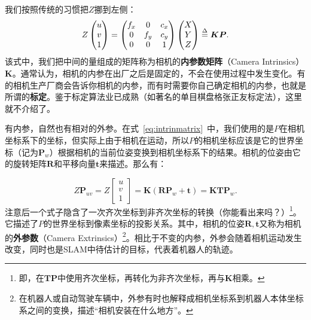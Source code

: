 我们按照传统的习惯把$Z$挪到左侧：
\begin{equation}
Z \begin{pmatrix} u\\ v\\ 1 \end{pmatrix}= \begin{pmatrix} f_x & 0&c_x \\ 0& f_y& c_y\\ 0&0 & 1 \end{pmatrix}\begin{pmatrix} X\\ Y\\ Z \end{pmatrix} 
\buildrel \Delta \over = \bm{K} \bm{P}.
\end{equation}
该式中，我们把中间的量组成的矩阵称为相机的\textbf{内参数矩阵}（Camera Intrinsics）$\bm{K}$。通常认为，相机的内参在出厂之后是固定的，不会在使用过程中发生变化。有的相机生产厂商会告诉你相机的内参，而有时需要你自己确定相机的内参，也就是所谓的\textbf{标定}。鉴于标定算法业已成熟（如著名的单目棋盘格张正友标定法\textsuperscript{\cite{Zhang1999}}），这里就不介绍了。

有内参，自然也有相对的外参。在式~\eqref{eq:intrinmatrix}~中，我们使用的是$P$在相机坐标系下的坐标，但实际上由于相机在运动，所以$P$的相机坐标应该是它的世界坐标（记为$\bm{P}_w$）根据相机的当前位姿变换到相机坐标系下的结果。相机的位姿由它的旋转矩阵$\bm{R}$和平移向量$\bm{t}$来描述。那么有：

\begin{equation}
\label{eq:cameraprojection}
Z \bm{P}_{uv}=
Z \left[ \begin{array}{l}
u\\
v\\
1
\end{array} \right] = \bm{K} \left( {\bm{R}{ \bm{P}_w} + \bm{t}} \right) =  \bm{K} \bm{T} \bm{P}_w .
\end{equation}
注意后一个式子隐含了一次齐次坐标到非齐次坐标的转换（你能看出来吗？）\footnote{即，在$\bm{T}\bm{P}$中使用齐次坐标，再转化为非齐次坐标，再与$\bm{K}$相乘。}。它描述了$P$的世界坐标到像素坐标的投影关系。其中，相机的位姿$\bm{R},\bm{t}$又称为相机的\textbf{外参数}（Camera Extrinsics）\footnote{在机器人或自动驾驶车辆中，外参有时也解释成相机坐标系到机器人本体坐标系之间的变换，描述“相机安装在什么地方”。}。相比于不变的内参，外参会随着相机运动发生改变，同时也是SLAM中待估计的目标，代表着机器人的轨迹。
%

